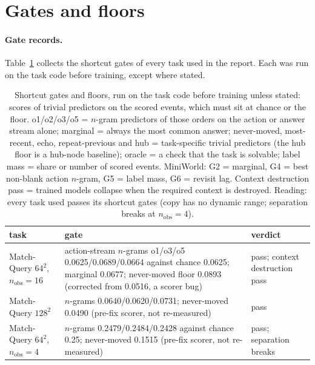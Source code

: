 \documentclass[10pt]{article}
\begin{document}
\clearpage
\appendix

\section{Gates and floors}
\label{app:gates}

\paragraph{Gate records.} Table~\ref{tab:gate-records} collects the shortcut gates of every task used in
the report. Each was run on the task code before training, except where stated.

\begin{table}[h]
\centering
\small
\captionsetup{font=footnotesize,skip=4pt}
\caption{Shortcut gates and floors, run on the task code before training unless stated: scores of trivial predictors on the scored events, which must sit at chance or the floor. o1/o2/o3/o5 = $n$-gram predictors of those orders on the action or answer stream alone; marginal = always the most common answer; never-moved, most-recent, echo, repeat-previous and hub = task-specific trivial predictors (the hub floor is a hub-node baseline); oracle = a check that the task is solvable; label mass = share or number of scored events. MiniWorld: G2 = marginal, G4 = best non-blank action $n$-gram, G5 = label mass, G6 = revisit lag. Context destruction pass = trained models collapse when the required context is destroyed. Reading: every task used passes its shortcut gates (copy has no dynamic range; separation breaks at $n_{\mathrm{obs}}=4$).}
\label{tab:gate-records}
\begin{tabular}{@{}p{3.3cm}p{8.2cm}p{3.1cm}@{}}
\toprule
task & gate & verdict \\
\midrule
Match-Query $64^2$, $n_{\mathrm{obs}}=16$ & action-stream $n$-grams o1/o3/o5 0.0625/0.0689/0.0664 against chance 0.0625; marginal 0.0677; never-moved floor 0.0893 (corrected from 0.0516, a scorer bug) & pass; context destruction pass \\
Match-Query $128^2$ & $n$-grams 0.0640/0.0620/0.0731; never-moved 0.0490 (pre-fix scorer, not re-measured) & pass \\
Match-Query $64^2$, $n_{\mathrm{obs}}=4$ & $n$-grams 0.2479/0.2484/0.2428 against chance 0.25; never-moved 0.1515 (pre-fix scorer, not re-measured) & pass; separation breaks \\

\end{tabular}
\end{table}
\end{document}
